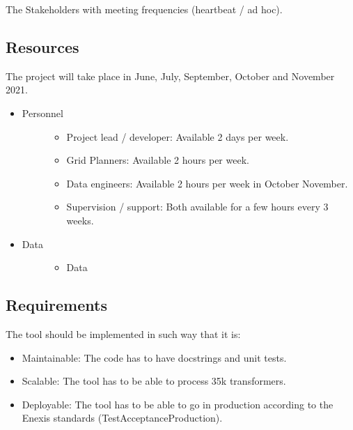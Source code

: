 \documentclass[letterpaper,10pt,english]{sphinxmanual}
\let\sphinxpxdimen\pdfpxdimen\else\newdimen\sphinxpxdimen
\begin{document}
\noindent{\hspace*{\fill}\sphinxincludegraphics[width=600\sphinxpxdimen]{{stakeholders}.png}\hspace*{\fill}}

The Stakeholders with meeting frequencies (heartbeat / ad hoc).


\subsection{Resources}
\label{\detokenize{business_understanding:resources}}
The project will take place in June, July, September, October and November 2021.
\begin{itemize}
\item {} \begin{description}
\item[{Personnel}] \leavevmode\begin{itemize}
\item {} 
Project lead / developer: Available 2 days per week.

\item {} 
Grid Planners: Available 2 hours per week.

\item {} 
Data engineers: Available 2 hours per week in October \sphinxhyphen{} November.

\item {} 
Supervision / support: Both available for a few hours every 3 weeks.

\end{itemize}

\end{description}

\item {} \begin{description}
\item[{Data}] \leavevmode\begin{itemize}
\item {} 
Data

\end{itemize}

\end{description}

\end{itemize}


\subsection{Requirements}
\label{\detokenize{business_understanding:requirements}}
The tool should be implemented in such way that it is:
\begin{itemize}
\item {} 
Maintainable: The code has to have docstrings and unit tests.

\item {} 
Scalable: The tool has to be able to process 35k transformers.

\item {} 
Deployable: The tool has to be able to go in production according to the Enexis standards (Test\sphinxhyphen{}Acceptance\sphinxhyphen{}Production).

\end{itemize}
\end{document}
